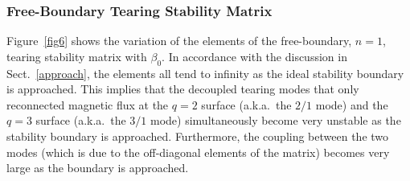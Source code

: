 \documentclass[12pt,prb,aps]{revtex4-1}
\begin{document}
\subsubsection{Free-Boundary Tearing Stability Matrix}
Figure~\ref{fig6} shows the variation of the elements of the free-boundary, $n=1$, tearing stability matrix with $\beta_0$. In accordance with the discussion in
Sect.~\ref{approach}, the elements all tend to infinity as the ideal stability boundary is approached. This implies that the decoupled tearing modes that
only reconnected magnetic flux at the $q=2$ surface (a.k.a.\ the $2/1$ mode) and the $q=3$ surface  (a.k.a.\ the $3/1$ mode)  simultaneously become very unstable as the
stability boundary is approached. Furthermore, the coupling between the two modes (which is due to the off-diagonal elements of the matrix)
becomes very large as the  boundary is approached. 
\end{document}
